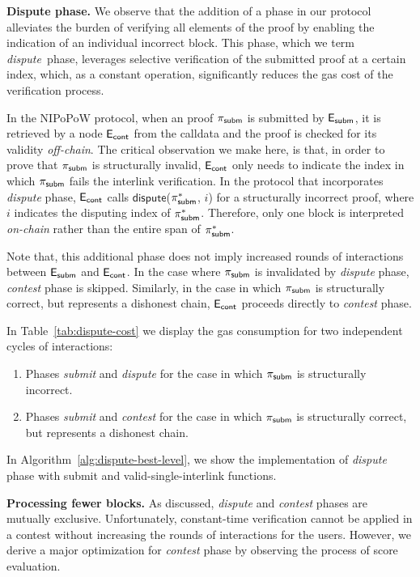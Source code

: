 \newcommand{\dispute}{\emph{dispute\ }} \noindent \textbf{Dispute phase.} We
observe that the addition of a phase in our protocol alleviates the burden of
verifying all elements of the proof by enabling the indication of an individual
incorrect block. This phase, which we term \dispute phase, leverages selective
verification of the submitted proof at a certain index, which, as a constant
operation, significantly reduces the gas cost of the verification process.

In the NIPoPoW protocol, when an proof $\mathsf{\pi_{subm}}$ is submitted by $\mathsf{E_{subm}}$, it is
retrieved by a node $\mathsf{E_{cont}}$ from the calldata and the proof is checked for its
validity \emph{off-chain}. The critical observation we make here, is that, in
order to prove that $\mathsf{\pi_{subm}}$ is structurally invalid, $\mathsf{E_{cont}}$ only needs to
indicate the index in which $\mathsf{\pi_{subm}}$ fails the interlink verification. In the
protocol that incorporates \emph{dispute} phase, $\mathsf{E_{cont}}$ calls
$\textsf{dispute}$($\mathsf{\pi_{subm}^*}$, $i$) for a structurally incorrect proof, where $i$
indicates the disputing index of $\mathsf{\pi_{subm}^*}$. Therefore, only one block is
interpreted \emph{on-chain} rather than the entire span of $\mathsf{\pi_{subm}^*}$.

Note that, this additional phase does not imply increased rounds of
interactions between $\mathsf{E_{subm}}$ and $\mathsf{E_{cont}}$. In the case where $\mathsf{\pi_{subm}}$ is invalidated
by \emph{dispute} phase, \emph{contest} phase is skipped.  Similarly, in the
case in which $\mathsf{\pi_{subm}}$ is structurally correct, but represents a dishonest
chain, $\mathsf{E_{cont}}$ proceeds directly to \emph{contest} phase.

In Table~\ref{tab:dispute-cost} we display the gas consumption for
two independent cycles of interactions:
\begin{enumerate}
    \item Phases \emph{submit} and \emph{dispute} for the case in which $\mathsf{\pi_{subm}}$
is structurally incorrect.
    \item Phases \emph{submit} and \emph{contest} for the case in which
$\mathsf{\pi_{subm}}$ is structurally correct, but represents a dishonest chain.
\end{enumerate}
\noindent
In Algorithm~\ref{alg:dispute-best-level}, we show the implementation of
\emph{dispute} phase with \textsf{submit} and \textsf{valid-single-interlink}
functions.



\noindent
\textbf{Processing fewer blocks.} As discussed, \emph{dispute} and
\emph{contest} phases are mutually exclusive. Unfortunately, constant-time
verification cannot be applied in a contest without increasing the rounds
of interactions for the users. However, we derive a major
optimization for \emph{contest} phase by observing the process of score
evaluation.

